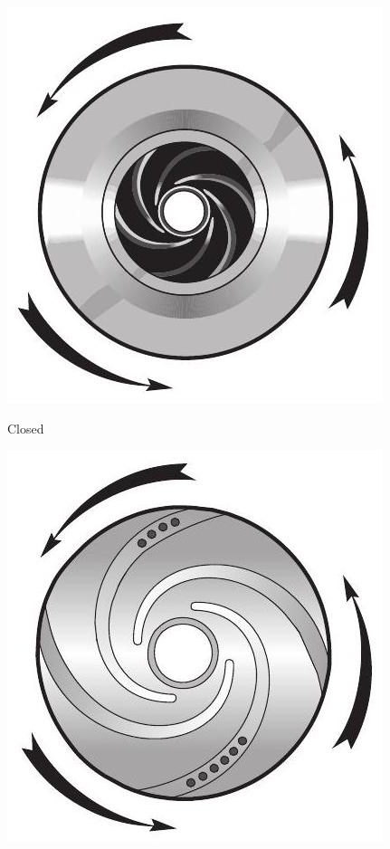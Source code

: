 \documentclass[10pt]{article}
\begin{document}
\includegraphics[max width=\textwidth]{CentrifugalPumpClosedImpeller}

Closed

\includegraphics[max width=\textwidth]{CentrifugalPumpSemiOpenImpeller}
\end{document}
